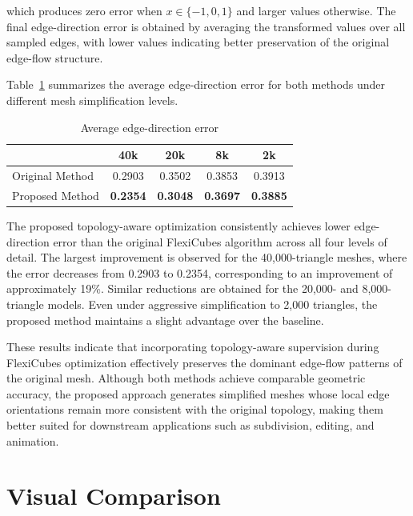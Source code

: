 \documentclass[../main.tex]{subfiles}
\begin{document}
which produces zero error when $x\in\{-1,0,1\}$ and larger values otherwise. The final edge-direction error is obtained by averaging the transformed values over all sampled edges, with lower values indicating better preservation of the original edge-flow structure.

Table~\ref{tab:edge_results} summarizes the average edge-direction error for both methods under different mesh simplification levels.

\begin{table}[H]
	\centering
	\caption{Average edge-direction error}
	\label{tab:edge_results}
	\begin{tabular}{lcccc}
		\hline
		& 40k & 20k & 8k & 2k \\
		\hline
		Original Method & 0.2903 & 0.3502 & 0.3853 & 0.3913 \\
		Proposed Method & \textbf{0.2354} & \textbf{0.3048} & \textbf{0.3697} & \textbf{0.3885} \\
		\hline
	\end{tabular}
\end{table}

The proposed topology-aware optimization consistently achieves lower edge-direction error than the original FlexiCubes algorithm across all four levels of detail. The largest improvement is observed for the 40,000-triangle meshes, where the error decreases from 0.2903 to 0.2354, corresponding to an improvement of approximately 19\%. Similar reductions are obtained for the 20,000- and 8,000-triangle models. Even under aggressive simplification to 2,000 triangles, the proposed method maintains a slight advantage over the baseline.

These results indicate that incorporating topology-aware supervision during FlexiCubes optimization effectively preserves the dominant edge-flow patterns of the original mesh. Although both methods achieve comparable geometric accuracy, the proposed approach generates simplified meshes whose local edge orientations remain more consistent with the original topology, making them better suited for downstream applications such as subdivision, editing, and animation.
\newpage

\section{Visual Comparison}
\end{document}
